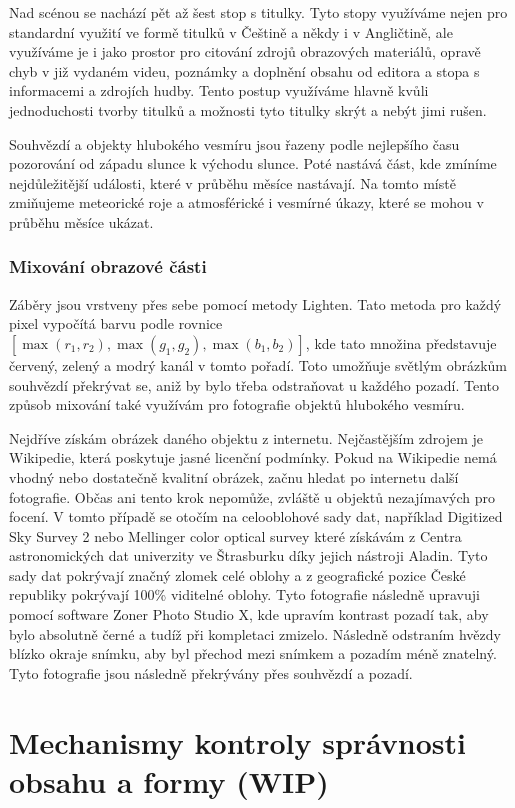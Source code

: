 \documentclass[12pt,a4paper,titlepage]{article}
\begin{document}
Nad scénou se nachází pět až šest stop s titulky. Tyto stopy využíváme nejen pro standardní využití ve formě titulků v Češtině a někdy i v Angličtině, ale využíváme je i jako prostor pro citování zdrojů obrazových materiálů, opravě chyb v již vydaném videu, poznámky a doplnění obsahu od editora a stopa s informacemi a zdrojích hudby. Tento postup využíváme hlavně kvůli jednoduchosti tvorby titulků a možnosti tyto titulky skrýt a nebýt jimi rušen. 

Souhvězdí a objekty hlubokého vesmíru jsou řazeny podle nejlepšího času pozorování od západu slunce k východu slunce. Poté nastává část, kde zmíníme nejdůležitější události, které v průběhu měsíce nastávají. Na tomto místě zmiňujeme meteorické roje a atmosférické i vesmírné úkazy, které se mohou v průběhu měsíce ukázat.
\subsubsection{Mixování obrazové části}
Záběry jsou vrstveny přes sebe pomocí metody Lighten. Tato metoda pro každý pixel vypočítá barvu podle rovnice $[\max(r_1, r_2), \max(g_1, g_2), \max(b_1, b_2)]$, kde tato množina představuje červený, zelený a modrý kanál v tomto pořadí. Toto umožňuje světlým obrázkům souhvězdí překrývat se, aniž by bylo třeba odstraňovat u každého pozadí. Tento způsob mixování také využívám pro fotografie objektů hlubokého vesmíru. 

Nejdříve získám obrázek daného objektu z internetu. Nejčastějším zdrojem je Wikipedie, která poskytuje jasné licenční podmínky. Pokud na Wikipedie nemá vhodný nebo dostatečně kvalitní obrázek, začnu hledat po internetu další fotografie. Občas ani tento krok nepomůže, zvláště u objektů nezajímavých pro focení. V tomto případě se otočím na celooblohové sady dat, například Digitized Sky Survey 2 nebo Mellinger color optical survey které získávám z Centra astronomických dat univerzity ve Štrasburku díky jejich nástroji Aladin. Tyto sady dat pokrývají značný zlomek celé oblohy a z geografické pozice České republiky pokrývají 100\% viditelné oblohy. Tyto fotografie následně upravuji pomocí software Zoner Photo Studio X, kde upravím kontrast pozadí tak, aby bylo absolutně černé a tudíž při kompletaci zmizelo. Následně odstraním hvězdy blízko okraje snímku, aby byl přechod mezi snímkem a pozadím méně znatelný. Tyto fotografie jsou následně překrývány přes souhvězdí a pozadí. 
\section{Mechanismy kontroly správnosti obsahu a formy (WIP)}
\end{document}
